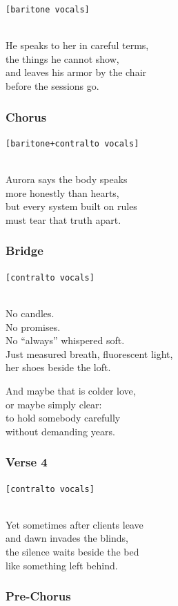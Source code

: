 \texttt{{[}baritone\ vocals{]}}\strut \\
He speaks to her in careful terms,\\
the things he cannot show,\\
and leaves his armor by the chair\\
before the sessions go.

\subsubsection{Chorus}\label{chorus-22}

\texttt{{[}baritone+contralto\ vocals{]}}\strut \\
Aurora says the body speaks\\
more honestly than hearts,\\
but every system built on rules\\
must tear that truth apart.

\subsubsection{Bridge}\label{bridge-6}

\texttt{{[}contralto\ vocals{]}}\strut \\
No candles.\\
No promises.\\
No ``always'' whispered soft.\\
Just measured breath, fluorescent light,\\
her shoes beside the loft.

And maybe that is colder love,\\
or maybe simply clear:\\
to hold somebody carefully\\
without demanding years.

\subsubsection{Verse 4}\label{verse-4-2}

\texttt{{[}contralto\ vocals{]}}\strut \\
Yet sometimes after clients leave\\
and dawn invades the blinds,\\
the silence waits beside the bed\\
like something left behind.

\subsubsection{Pre-Chorus}\label{pre-chorus-13}


